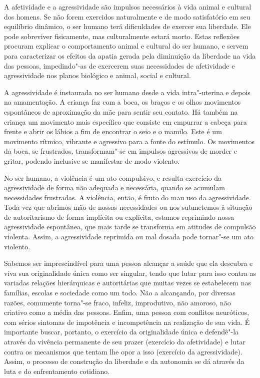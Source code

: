 A afetividade e a agressividade são impulsos necessários à vida
animal e cultural dos homens. Se não forem exercidos naturalmente e de
modo satisfatório em seu equilíbrio dinâmico, o ser humano terá
dificuldades de exercer sua liberdade. Ele pode sobreviver fisicamente,
mas culturalmente estará morto. Estas reflexões procuram explicar o
comportamento animal e cultural do ser humano, e servem para
caracterizar os efeitos da apatia gerada pela diminuição da liberdade na
vida das pessoas, impedindo"-as de exercerem suas necessidades de
afetividade e agressividade nos planos biológico e animal, social e
cultural.

A agressividade é instaurada no ser humano desde a vida intra"-uterina e
depois na amamentação. A criança faz com a boca, os braços e os olhos
movimentos espontâneos de aproximação da mãe para sentir seu contato. Há
também na criança um movimento mais específico que consiste em empurrar
a cabeça para frente e abrir os lábios a fim de encontrar o seio e o
mamilo. Este é um movimento rítmico, vibrante e agressivo para a fonte
do estímulo. Os movimentos da boca, se frustrados, transformam"-se em
impulsos agressivos de morder e gritar, podendo inclusive se manifestar
de modo violento.

No ser humano, a violência é um ato compulsivo, e resulta exercício da
agressividade de forma não adequada e necessária, quando se acumulam
necessidades frustradas. A violência, então, é fruto do mau uso da
agressividade. Toda vez que abrimos mão de nossas necessidades ou nos
submetemos à situação de autoritarismo de forma implícita ou explícita,
estamos reprimindo nossa agressividade espontânea, que mais tarde se
transforma em atitudes de compulsão violenta. Assim, a agressividade
reprimida ou mal dosada pode tornar"-se um ato violento.

Sabemos ser imprescindível para uma pessoa alcançar a saúde que ela
descubra e viva sua originalidade única como ser singular, tendo que
lutar para isso contra as variadas relações hierárquicas e autoritárias
que muitas vezes se estabelecem nas famílias, escolas e sociedade como
um todo. Não a alcançando, por diversas razões, comumente torna"-se
fraco, infeliz, improdutivo, não amoroso, não criativo como a média das
pessoas. Enfim, uma pessoa com conflitos neuróticos, com sérios sintomas
de impotência e incompetência na realização de sua vida. É importante
buscar, portanto, o exercício da originalidade única e defendê"-la
através da vivência permanente de seu prazer (exercício da afetividade)
e lutar contra os mecanismos que tentam lhe opor a isso (exercício da
agressividade). Assim, o processo de construção da liberdade e da
autonomia se dá através da luta e do enfrentamento cotidiano.

